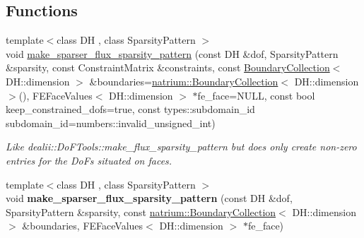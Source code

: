 \subsection*{Functions}
\begin{DoxyCompactItemize}
\item 
\hypertarget{namespacenatrium_1_1DealIIExtensions_a9796541c82011b8b792400ebefd9c008}{
{\footnotesize template$<$class DH , class SparsityPattern $>$ }\\void \hyperlink{namespacenatrium_1_1DealIIExtensions_a9796541c82011b8b792400ebefd9c008}{make\_\-sparser\_\-flux\_\-sparsity\_\-pattern} (const DH \&dof, SparsityPattern \&sparsity, const ConstraintMatrix \&constraints, const \hyperlink{classnatrium_1_1BoundaryCollection}{BoundaryCollection}$<$ DH::dimension $>$ \&boundaries=\hyperlink{classnatrium_1_1BoundaryCollection}{natrium::BoundaryCollection}$<$ DH::dimension $>$(), FEFaceValues$<$ DH::dimension $>$ $\ast$fe\_\-face=NULL, const bool keep\_\-constrained\_\-dofs=true, const types::subdomain\_\-id subdomain\_\-id=numbers::invalid\_\-unsigned\_\-int)}
\label{namespacenatrium_1_1DealIIExtensions_a9796541c82011b8b792400ebefd9c008}

\begin{DoxyCompactList}\small\item\em Like dealii::DoFTools::make\_\-flux\_\-sparsity\_\-pattern but does only create non-\/zero entries for the DoFs situated on faces. \item\end{DoxyCompactList}\item 
\hypertarget{namespacenatrium_1_1DealIIExtensions_a4bc61b539df963c21b595378f9b80f5a}{
{\footnotesize template$<$class DH , class SparsityPattern $>$ }\\void {\bfseries make\_\-sparser\_\-flux\_\-sparsity\_\-pattern} (const DH \&dof, SparsityPattern \&sparsity, const \hyperlink{classnatrium_1_1BoundaryCollection}{natrium::BoundaryCollection}$<$ DH::dimension $>$ \&boundaries, FEFaceValues$<$ DH::dimension $>$ $\ast$fe\_\-face)}
\label{namespacenatrium_1_1DealIIExtensions_a4bc61b539df963c21b595378f9b80f5a}


\end{DoxyCompactItemize}
